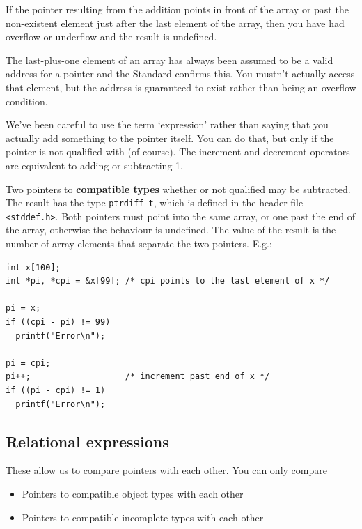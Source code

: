    If the pointer resulting from the addition points in front of the
    array or past the non-existent element just after the last element of
    the array, then you have had overflow or underflow and the result is
    undefined.


   The last-plus-one element of an array has always been assumed to be
    a valid address for a pointer and the Standard confirms this. You
    mustn't actually access that element, but the address is guaranteed to
    exist rather than being an overflow condition.


   We've been careful to use the term `expression' rather than
    saying that you actually add something to the pointer itself. You can do
    that, but only if the pointer is not qualified with \const{}
    (of course). The increment and decrement operators are equivalent to
    adding or subtracting 1.


   Two pointers to \textbf{compatible types} whether or not qualified
    may be subtracted. The result has the type \texttt{ptrdiff\_t}, which
    is defined in the header file \texttt{<stddef.h>}. Both
    pointers must point into the same array, or one past the end of the
    array, otherwise the behaviour is undefined. The value of the result is
    the number of array elements that separate the two pointers. E.g.:


   \begin{Verbatim}
int x[100];
int *pi, *cpi = &x[99]; /* cpi points to the last element of x */

pi = x;
if ((cpi - pi) != 99)
  printf("Error\n");

pi = cpi;
pi++;                   /* increment past end of x */
if ((pi - cpi) != 1)
  printf("Error\n");
\end{Verbatim}

  

  \subsection{Relational expressions}
   

   These allow us to compare pointers with each other. You can only
    compare


   \begin{itemize}
    \item Pointers to compatible object types with each other
    \item Pointers to compatible incomplete types with each other
   \end{itemize}

